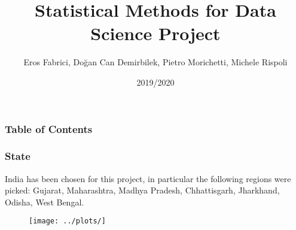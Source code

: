 \documentclass{beamer}
\title{Statistical Methods for Data Science Project}
\author{Eros Fabrici, Doğan Can Demirbilek, Pietro Morichetti, Michele Rispoli}
\institute{University of Trieste}
\date{2019/2020}
\begin{document}
\frame{\titlepage}

\begin{frame}
\frametitle{Table of Contents}
\tableofcontents
\end{frame}

\begin{frame}
\frametitle{State}
India has been chosen for this project, in particular the following regions were picked: Gujarat, Maharashtra, Madhya Pradesh, Chhattisgarh, Jharkhand, Odisha, West Bengal.
\end{frame}

\begin{frame}
\begin{figure}
	\texttt{[image: ../plots/]}
\end{figure}
\end{frame}
\end{document}
